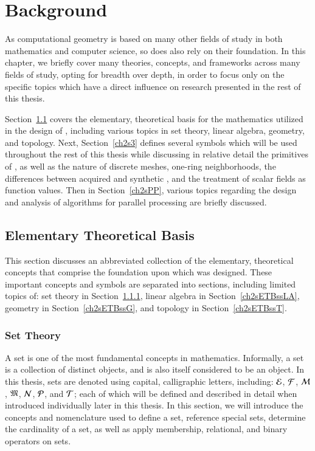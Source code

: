 \chapter{Background}
\label{ch2}
As computational geometry is based on many other fields of study in both mathematics and computer science, so does  also rely on their foundation. In this chapter, we briefly cover many theories, concepts, and frameworks across many fields of study, opting for breadth over depth, in order to focus only on the specific topics which have a direct influence on research presented in the rest of this thesis.

Section~\ref{ch2sETB} covers the elementary, theoretical basis for the mathematics utilized in the design of , including various topics in set theory, linear algebra, geometry, and topology. Next, Section~\ref{ch2s3} defines several symbols which will be used throughout the rest of this thesis while discussing in relative detail the primitives of \tdd{}, as well as the nature of discrete meshes, one-ring neighborhoods, the differences between acquired and synthetic \tdd{}, and the treatment of scalar fields as function values. Then in Section~\ref{ch2sPP}, various topics regarding the design and analysis of algorithms for parallel processing are briefly discussed.

%
%
%
%
%
%
\section{Elementary Theoretical Basis}
\label{ch2sETB}
This section discusses an abbreviated collection of the elementary, theoretical concepts that comprise the foundation upon which  was designed. These important concepts and symbols are separated into sections, including limited topics of: set theory in Section~\ref{ch2sETBssST}, linear algebra in Section~\ref{ch2sETBssLA}, geometry in Section~\ref{ch2sETBssG}, and topology in Section~\ref{ch2sETBssT}.

%
%
%
%
\subsection{Set Theory}
\label{ch2sETBssST}
A set is one of the most fundamental concepts in mathematics. Informally, a set is a collection of distinct objects, and is also itself considered to be an object. In this thesis, sets are denoted using capital, calligraphic letters, including: $\mathcal{E}$, $\mathcal{F}$, $\mathcal{M}$, $\mathfrak{M}$, $\mathcal{N}$, $\mathcal{P}$, and $\mathcal{T}$; each of which will be defined and described in detail when introduced individually later in this thesis. In this section, we will introduce the concepts and nomenclature used to define a set, reference special sets, determine the cardinality of a set, as well as apply membership, relational, and binary operators on sets.

